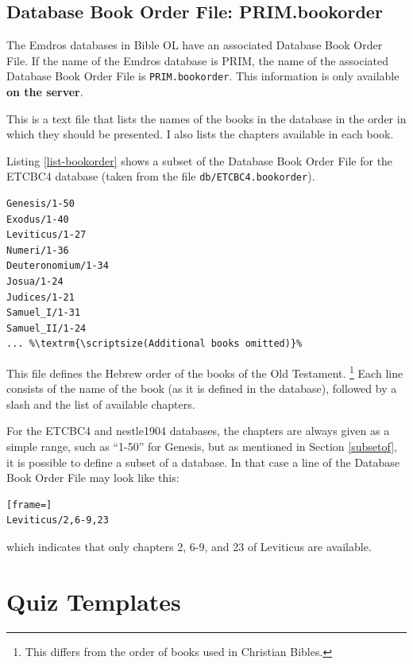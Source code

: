 \documentclass[11pt,oneside,a4paper]{memoir}
\begin{document}
\section{Database Book Order File: PRIM.bookorder}\label{sec-bookorder}

The Emdros databases in Bible OL have an associated Database Book Order File. If the name of
the Emdros database is PRIM, the name of the associated Database Book Order File is
\texttt{PRIM.bookorder}. This information is only available \textbf{on the server}.

This is a text file that lists the names of the books in the database in the order in which they
should be presented. I also lists the chapters available in each book.

Listing \ref{list-bookorder} shows a subset of the Database Book Order File for the ETCBC4 database
(taken from the file \texttt{db/ETCBC4.bookorder}).

\begin{lstlisting}[caption=A subset of the ETCBC4 Book Order File,label=list-bookorder]
Genesis/1-50
Exodus/1-40
Leviticus/1-27
Numeri/1-36
Deuteronomium/1-34
Josua/1-24
Judices/1-21
Samuel_I/1-31
Samuel_II/1-24
... %\textrm{\scriptsize(Additional books omitted)}%
\end{lstlisting}

This file defines the Hebrew order of the books of the Old Testament.%
%
\footnote{This differs from the order of books used in Christian Bibles.} Each line
consists of the name of the book (as it is defined in the database), followed by a slash and the
list of available chapters.

For the ETCBC4 and nestle1904 databases, the chapters are always given as a simple range, such as
``1-50'' for Genesis, but as mentioned in Section \ref{subsetof}, it is possible to define a
subset of a database. In that case a line of the Database Book Order File may look like this:

\begin{lstlisting}[frame=]
Leviticus/2,6-9,23
\end{lstlisting}

\noindent
which indicates that only chapters 2, 6-9, and 23 of Leviticus are available.


\chapter{Quiz Templates}
\end{document}
